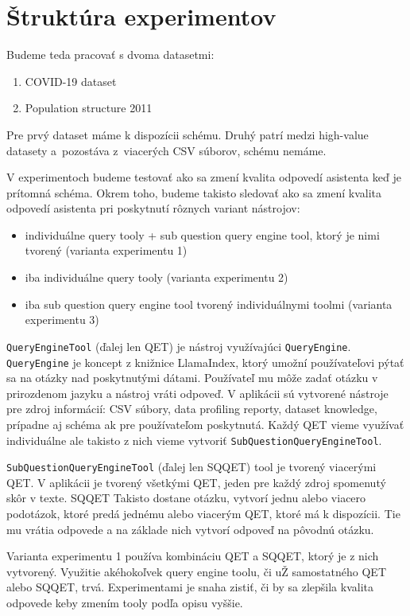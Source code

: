 \section{Štruktúra experimentov}

Budeme teda pracovať s dvoma datasetmi:
\begin{enumerate}
\item COVID-19 dataset
\item Population structure 2011
\end{enumerate}

Pre prvý dataset máme k dispozícii schému. Druhý patrí medzi high-value datasety a~pozostáva z~viacerých CSV súborov, schému nemáme.

V experimentoch budeme testovať ako sa zmení kvalita odpovedí asistenta keď je prítomná schéma. Okrem toho, budeme takisto sledovať ako sa zmení kvalita odpovedí asistenta pri poskytnutí rôznych variant nástrojov:
\begin{itemize}
\item individuálne query tooly + sub question query engine tool, ktorý je nimi tvorený (varianta experimentu 1)
\item iba individuálne query tooly (varianta experimentu 2)
\item iba sub question query engine tool tvorený individuálnymi toolmi (varianta experimentu 3)
\end{itemize}

\texttt{QueryEngineTool} (ďalej len QET) je nástroj využívajúci \texttt{QueryEngine}. \texttt{QueryEngine} je koncept z knižnice LlamaIndex, ktorý umožní používateľovi pýtať sa na otázky nad poskytnutými dátami. Používateľ mu môže zadať otázku v prirozdenom jazyku a nástroj vráti odpoveď. V aplikácii sú vytvorené nástroje pre zdroj informácií: CSV súbory, data profiling reporty, dataset knowledge, prípadne aj schéma ak pre používateľom poskytnutá. Každý QET vieme využívať individuálne ale takisto z nich vieme vytvoriť \texttt{SubQuestionQueryEngineTool}.

\texttt{SubQuestionQueryEngineTool} (ďalej len SQQET) tool je tvorený viacerými QET. V aplikácii je tvorený všetkými QET, jeden pre každý zdroj spomenutý skôr v texte. SQQET Takisto dostane otázku, vytvorí jednu alebo viacero podotázok, ktoré predá jednému alebo viacerým QET, ktoré má k dispozícii. Tie mu vrátia odpovede a na základe nich vytvorí odpoveď na pôvodnú otázku.

Varianta experimentu 1 používa kombináciu QET a SQQET, ktorý je z nich vytvorený. Využitie akéhokoľvek query engine toolu, či uŽ samostatného QET alebo SQQET, trvá. Experimentami je snaha zistiť, či by sa zlepšila kvalita odpovede keby zmením tooly podľa opisu vyššie.

